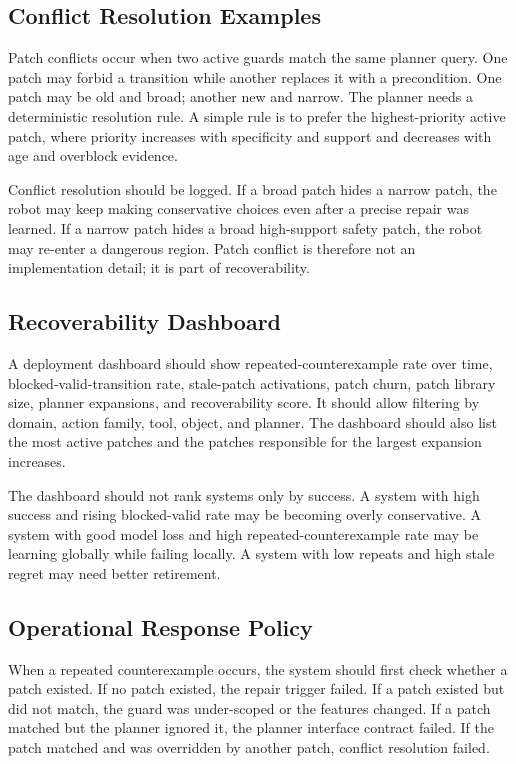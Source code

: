 \documentclass{article}
\begin{document}
\subsection{Conflict Resolution Examples}

Patch conflicts occur when two active guards match the same planner query. One
patch may forbid a transition while another replaces it with a precondition.
One patch may be old and broad; another new and narrow. The planner needs a
deterministic resolution rule. A simple rule is to prefer the highest-priority
active patch, where priority increases with specificity and support and
decreases with age and overblock evidence.

Conflict resolution should be logged. If a broad patch hides a narrow patch,
the robot may keep making conservative choices even after a precise repair was
learned. If a narrow patch hides a broad high-support safety patch, the robot
may re-enter a dangerous region. Patch conflict is therefore not an
implementation detail; it is part of recoverability.

\subsection{Recoverability Dashboard}

A deployment dashboard should show repeated-counterexample rate over time,
blocked-valid-transition rate, stale-patch activations, patch churn, patch
library size, planner expansions, and recoverability score. It should allow
filtering by domain, action family, tool, object, and planner. The dashboard
should also list the most active patches and the patches responsible for the
largest expansion increases.

The dashboard should not rank systems only by success. A system with high
success and rising blocked-valid rate may be becoming overly conservative. A
system with good model loss and high repeated-counterexample rate may be
learning globally while failing locally. A system with low repeats and high
stale regret may need better retirement.

\subsection{Operational Response Policy}

When a repeated counterexample occurs, the system should first check whether a
patch existed. If no patch existed, the repair trigger failed. If a patch
existed but did not match, the guard was under-scoped or the features changed.
If a patch matched but the planner ignored it, the planner interface contract
failed. If the patch matched and was overridden by another patch, conflict
resolution failed.
\end{document}

